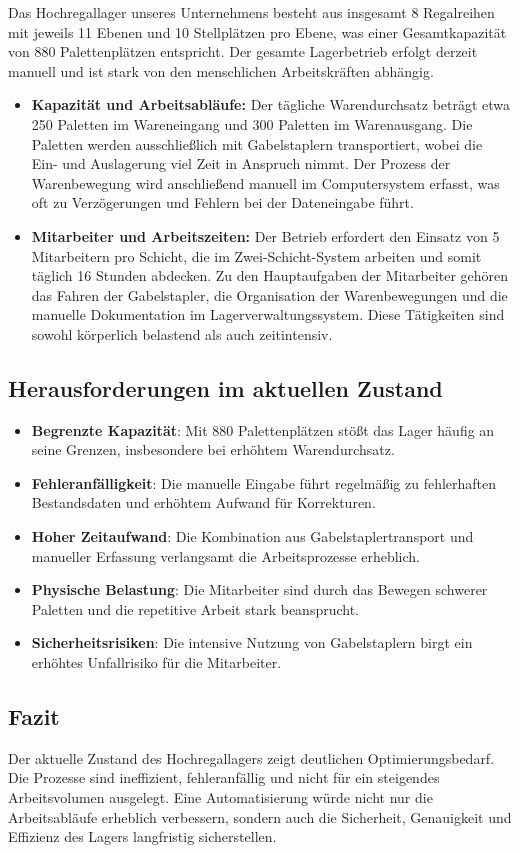 Das Hochregallager unseres Unternehmens besteht aus insgesamt 8 Regalreihen mit jeweils 11 Ebenen und 10 Stellplätzen pro Ebene, was einer Gesamtkapazität von 880 Palettenplätzen entspricht. Der gesamte Lagerbetrieb erfolgt derzeit manuell und ist stark von den menschlichen Arbeitskräften abhängig.
\begin{itemize}
	\item \textbf{Kapazität und Arbeitsabläufe:} 
	Der tägliche Warendurchsatz beträgt etwa 250 Paletten im Wareneingang und 300 Paletten im Warenausgang. Die Paletten werden ausschließlich mit Gabelstaplern transportiert, wobei die Ein- und Auslagerung viel Zeit in Anspruch nimmt. Der Prozess der Warenbewegung wird anschließend manuell im Computersystem erfasst, was oft zu Verzögerungen und Fehlern bei der Dateneingabe führt.
	
	\item \textbf{Mitarbeiter und Arbeitszeiten:}
	Der Betrieb erfordert den Einsatz von 5 Mitarbeitern pro Schicht, die im Zwei-Schicht-System arbeiten und somit täglich 16 Stunden abdecken. Zu den Hauptaufgaben der Mitarbeiter gehören das Fahren der Gabelstapler, die Organisation der Warenbewegungen und die manuelle Dokumentation im Lagerverwaltungssystem. Diese Tätigkeiten sind sowohl körperlich belastend als auch zeitintensiv.
\end{itemize}


\subsection*{Herausforderungen im aktuellen Zustand}

\begin{itemize}
	\item \textbf{Begrenzte Kapazität}: Mit 880 Palettenplätzen stößt das Lager häufig an seine Grenzen, insbesondere bei erhöhtem Warendurchsatz.
	\item \textbf{Fehleranfälligkeit}: Die manuelle Eingabe führt regelmäßig zu fehlerhaften Bestandsdaten und erhöhtem Aufwand für Korrekturen.
	\item \textbf{Hoher Zeitaufwand}: Die Kombination aus Gabelstaplertransport und manueller Erfassung verlangsamt die Arbeitsprozesse erheblich.
	\item \textbf{Physische Belastung}: Die Mitarbeiter sind durch das Bewegen schwerer Paletten und die repetitive Arbeit stark beansprucht.
	\item \textbf{Sicherheitsrisiken}: Die intensive Nutzung von Gabelstaplern birgt ein erhöhtes Unfallrisiko für die Mitarbeiter.
\end{itemize}

\subsection*{Fazit}

Der aktuelle Zustand des Hochregallagers zeigt deutlichen Optimierungsbedarf. Die Prozesse sind ineffizient, fehleranfällig und nicht für ein steigendes Arbeitsvolumen ausgelegt. Eine Automatisierung würde nicht nur die Arbeitsabläufe erheblich verbessern, sondern auch die Sicherheit, Genauigkeit und Effizienz des Lagers langfristig sicherstellen.